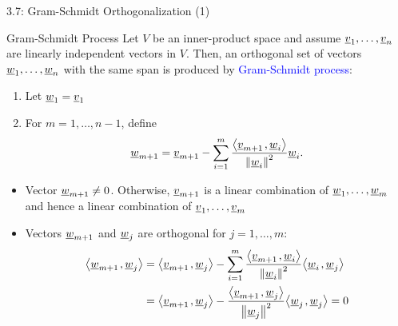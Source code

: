 \documentclass[10pt,letterpaper,english]{beamer}
\begin{document}
\begin{frame}{3.7: Gram-Schmidt Orthogonalization (1)}

\begin{block}{Gram-Schmidt Process}
Let $V$ be an inner-product space and assume $\underline{v}_1, \ldots, \underline{v}_n$ are linearly independent vectors in $V$.
Then, an orthogonal set of vectors $\underline{w}_1, \ldots, \underline{w}_n$ with the same span is produced by \textcolor{blue}{Gram-Schmidt process}:
\begin{enumerate}
\item Let $\underline{w}_1 = \underline{v}_1$

\item For $m=1,\ldots,n-1$, define \vspace{-3.5mm}
\begin{equation*}
\underline{w}_{m+1} = \underline{v}_{m+1} - \sum_{i=1}^m \frac{ {\left\langle  \underline{v}_{m+1}  \mskip2mu ,  \underline{w}_i  \right\rangle} } { \left\| \underline{w}_i \right\|^2 } \underline{w}_i.
\end{equation*}
\end{enumerate}
\end{block}

\begin{itemize}
\item<2-> Vector $\underline{w}_{m+1} \neq 0$. Otherwise, $\underline{v}_{m+1}$ is a linear combination of $\underline{w}_1, \ldots, \underline{w}_m$ and hence a linear combination of $\underline{v}_1, \ldots, \underline{v}_m$ \vspace{2.5mm}

\item<3-> Vectors $\underline{w}_{m+1}$ and $\underline{w}_j$ are orthogonal for $j=1,\ldots,m$: \vspace{-1.5mm}
\begin{equation*}
\begin{split}
{\left\langle  \underline{w}_{m+1}  \mskip2mu ,  \underline{w}_j  \right\rangle}
&= {\left\langle  \underline{v}_{m+1}  \mskip2mu ,  \underline{w}_j  \right\rangle}
- \sum_{i=1}^m \frac{ {\left\langle  \underline{v}_{m+1}  \mskip2mu ,  \underline{w}_i  \right\rangle} } { \left\| \underline{w}_i \right\|^2 }
{\left\langle  \underline{w}_i  \mskip2mu ,  \underline{w}_j  \right\rangle} \\
&= {\left\langle  \underline{v}_{m+1}  \mskip2mu ,  \underline{w}_j  \right\rangle}
- \frac{ {\left\langle  \underline{v}_{m+1}  \mskip2mu ,  \underline{w}_j  \right\rangle} } { \left\| \underline{w}_j \right\|^2 }
{\left\langle  \underline{w}_j  \mskip2mu ,  \underline{w}_j  \right\rangle} = 0
\end{split}
\end{equation*}

\end{itemize}

\end{frame}
\end{document}
